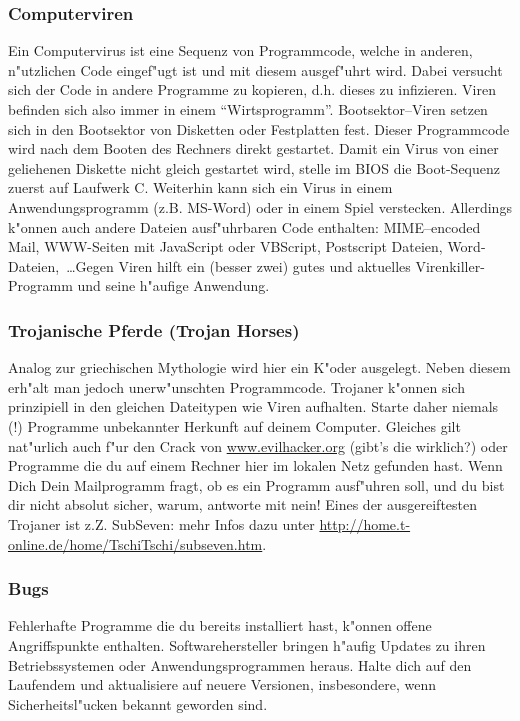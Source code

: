 \documentclass[12pt,titlepage,twoside]{scrartcl}
\begin{document}
\subsubsection{Computerviren}
Ein Computervirus ist eine Sequenz von Programmcode, welche 
in anderen, n"utzlichen Code eingef"ugt ist und mit diesem ausgef"uhrt wird. 
Dabei versucht sich der Code in andere Programme zu kopieren, d.h. dieses zu 
infizieren. Viren befinden sich also immer in einem "`Wirtsprogramm"'. 
Bootsektor--Viren setzen sich in den Bootsektor von Disketten oder Festplatten
fest. Dieser Programmcode wird nach dem Booten des Rechners direkt gestartet.
Damit ein Virus von einer geliehenen Diskette nicht gleich gestartet
wird, stelle im BIOS die Boot-Sequenz zuerst auf Laufwerk C.
Weiterhin kann sich ein Virus in einem Anwendungsprogramm (z.B. MS-Word) oder
in einem Spiel verstecken. Allerdings k"onnen auch andere Dateien ausf"uhrbaren
Code enthalten: MIME--encoded Mail, WWW-Seiten mit JavaScript oder VBScript,
Postscript Dateien, Word-Dateien,~\dots Gegen Viren hilft ein (besser zwei) gutes
und aktuelles Virenkiller-Programm und seine h"aufige Anwendung.

\subsubsection{Trojanische Pferde (Trojan Horses)} 
Analog zur griechischen Mythologie wird
hier ein K"oder ausgelegt. Neben diesem erh"alt man jedoch unerw"unschten
Programmcode. Trojaner k"onnen sich prinzipiell in den gleichen Dateitypen
wie Viren aufhalten. Starte daher niemals (!) Programme unbekannter Herkunft 
auf deinem Computer. Gleiches gilt nat"urlich auch f"ur den Crack von
\url{www.evilhacker.org} (gibt's die wirklich?) oder Programme die du auf einem
Rechner hier im lokalen Netz gefunden hast. Wenn Dich Dein Mailprogramm fragt,
ob es ein Programm ausf"uhren soll, und du bist dir nicht absolut sicher, warum,
antworte mit nein! Eines der ausgereiftesten Trojaner ist z.Z. SubSeven: mehr
Infos dazu unter \url{http://home.t-online.de/home/TschiTschi/subseven.htm}.

\subsubsection{Bugs}
Fehlerhafte Programme die du bereits installiert hast, k"onnen offene
Angriffspunkte enthalten. Softwarehersteller 
bringen h"aufig Updates zu ihren Betriebssystemen oder Anwendungsprogrammen heraus. 
Halte dich auf den Laufendem und aktualisiere auf neuere Versionen, insbesondere, 
wenn Sicherheitsl"ucken bekannt geworden sind.  
\end{document}
